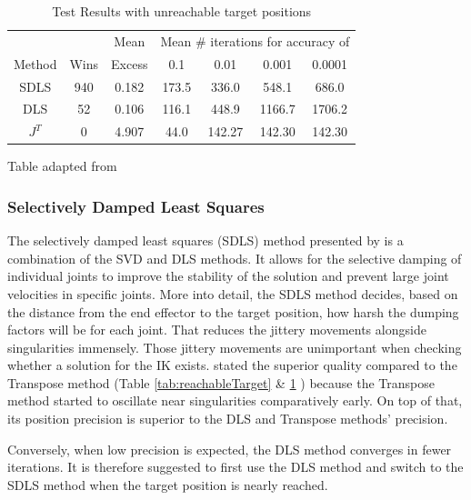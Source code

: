 \documentclass[conference]{IEEEtran}
\begin{document}
\begin{table}[htbp]
\centering
\begin{threeparttable}
\caption{Test Results with unreachable target positions}
\label{tab:unreachableTarget}
\begin{tabular}{c|cccccc}
 & & Mean & \multicolumn{4}{c}{Mean \# iterations for accuracy of} \\
Method & Wins & Excess & 0.1 & 0.01 & 0.001 & 0.0001 \\
\hline
SDLS   & 940  & 0.182  & 173.5 & 336.0 & 548.1 & 686.0  \\
DLS    & 52   & 0.106  & 116.1 & 448.9 & 1166.7 & 1706.2 \\
$J^T$  & 0    & 4.907  & 44.0  & 142.27 & 142.30 & 142.30 \\
\hline
\end{tabular}
\begin{tablenotes}\footnotesize
\centering
\item[] Table adapted from \cite{buss_selectively_2005}
\end{tablenotes}
\end{threeparttable}
\end{table}

\subsubsection{Selectively Damped Least Squares}
The selectively damped least squares (SDLS) method presented by \cite{buss_selectively_2005} is a combination of the SVD and DLS methods. It allows for the selective damping of individual joints to improve the stability of the solution and prevent large joint velocities in specific joints. More into detail, the SDLS method decides, based on the distance from the end effector to the target position, how harsh the dumping factors will be for each joint. That reduces the jittery movements alongside singularities immensely. Those jittery movements are unimportant when checking whether a solution for the IK exists. \cite{buss_selectively_2005} stated the superior quality compared to the Transpose method (Table \ref{tab:reachableTarget} \& \ref{tab:unreachableTarget} ) because the Transpose method started to oscillate near singularities comparatively early. On top of that, its position precision is superior to the DLS and Transpose methods' precision.

Conversely, when low precision is expected, the DLS method converges in fewer iterations. It is therefore suggested to first use the DLS method and switch to the SDLS method when the target position is nearly reached.
\end{document}

